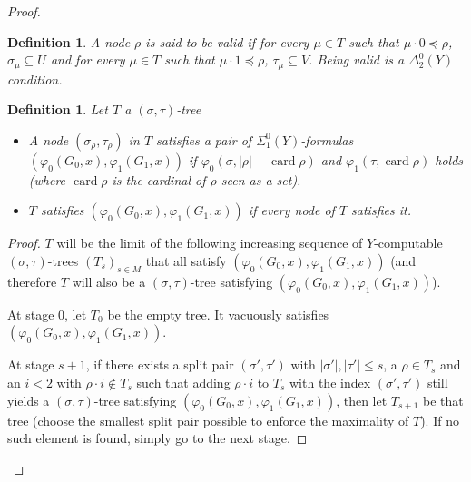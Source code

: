 \documentclass{article}
\numberwithin{theorem}{section}
\newtheorem{lemma}[theorem]{Lemma}
\newtheorem{definition}[theorem]{Definition}
\newcommand{\card}{\operatorname{card}}
\begin{document}
\begin{proof}
\begin{definition}
     A node $\rho$ is said to be \emph{valid} if for every $\mu \in T$ such that $\mu \cdot 0 \preceq \rho$, $\sigma_{\mu} \subseteq U$ and for every $\mu \in T$ such that $\mu \cdot 1 \preceq \rho$, $\tau_{\mu} \subseteq V$. Being valid is a $\Delta^0_2(Y)$ condition.
\end{definition}


\begin{definition}
    Let $T$ a $(\sigma,\tau)$-tree 
    \begin{itemize}
        \item A node $(\sigma_{\rho}, \tau_{\rho})$ in $T$ \emph{satisfies} a pair of $\Sigma^0_1(Y)$-formulas $(\varphi_0(G_0, x), \varphi_1(G_1,x))$ if $\varphi_0(\sigma, |\rho| - \card \rho)$ and $\varphi_1(\tau, \card \rho)$ holds (where $\card \rho$ is the cardinal of $\rho$ seen as a set).
        \item $T$ \emph{satisfies} $(\varphi_0(G_0, x), \varphi_1(G_1,x))$ if every node of $T$ satisfies it.
    \end{itemize}
\end{definition}


\begin{proof}
$T$ will be the limit of the following increasing sequence of $Y$-computable $(\sigma, \tau)$-trees $(T_s)_{s \in M}$ that all satisfy $(\varphi_0(G_0, x), \varphi_1(G_1,x))$ (and therefore $T$ will also be a $(\sigma, \tau)$-tree satisfying $(\varphi_0(G_0, x), \varphi_1(G_1,x))$). 

At stage $0$, let $T_0$ be the empty tree. It vacuously satisfies $(\varphi_0(G_0, x), \varphi_1(G_1,x))$.

At stage $s+1$, if there exists a split pair $(\sigma', \tau')$ with $|\sigma'|,|\tau'| \leq s$, a $\rho \in T_s$ and an $i < 2$ with $\rho \cdot i \notin T_s$ such that adding $\rho \cdot i$ to $T_s$ with the index $(\sigma', \tau')$ still yields a $(\sigma, \tau)$-tree satisfying $(\varphi_0(G_0, x), \varphi_1(G_1,x))$, then let $T_{s+1}$ be that tree (choose the smallest split pair possible to enforce the maximality of $T$). If no such element is found, simply go to the next stage.
\end{proof}


\end{proof}
\end{document}
